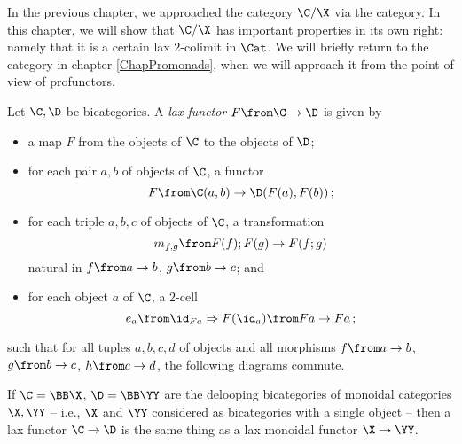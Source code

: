 In the previous chapter, we approached the category $\C/\X$ via the \Mellies category.  
In this chapter, we will show that $\C/\X$ has important properties in its own right: namely that it is a certain lax $2$-colimit in $\Cat$.  
We will briefly return to the \Mellies category in chapter \ref{ChapPromonads}, when we will approach it from the point of view of profunctors.

\begin{definition}
  Let $\C,\D$ be bicategories.  
  A \emph{lax functor} $F\from\C \to \D$ is given by
  \begin{itemize}
    \item a map $F$ from the objects of $\C$ to the objects of $\D$;
    \item for each pair $a,b$ of objects of $\C$, a functor
      \[
        F \from \C(a,b) \to \D(F(a),F(b))\,;
        \]
    \item for each triple $a,b,c$ of objects of $\C$, a transformation 
      \[
        m_{f,g}\from F(f);F(g) \to F(f;g)
        \]
      natural in $f\from a \to b$, $g\from b \to c$; and
    \item for each object $a$ of $\C$, a $2$-cell 
      \[
        e_a\from \id_{Fa} \Rightarrow F(\id_a)\from Fa \to Fa\,;
        \]
  \end{itemize}
  such that for all tuples $a,b,c,d$ of objects and all morphisms $f\from a \to b$, $g\from b \to c$, $h \from c \to d$, the following diagrams commute.
\end{definition}
\begin{example}
  If $\C = \BB \X$, $\D = \BB \YY$ are the delooping bicategories of monoidal categories $\X, \YY$ -- i.e., $\X$ and $\YY$ considered as bicategories with a single object -- then a lax functor $\C \to \D$ is the same thing as a lax monoidal functor $\X \to \YY$.  
\end{example}

